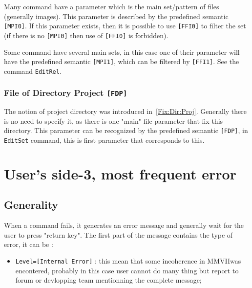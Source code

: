 \documentclass[a4paper]{book}
\newcommand{\PPP}{MMVII}
\begin{document}
{Many command have a parameter which is the main set/pattern of files (generally images).
This  parameter is described by the predefined semantic {\tt [MPI0]}. If this
parameter exists, then  it is possible to use {\tt [FFI0]} to filter the set (if there
is no {\tt [MPI0]} then use of {\tt [FFI0]}  is forbidden).

Some command have several main sets, in this case one of their parameter will have
the predefined semantic {\tt [MPI1]}, which can be filtered by {\tt [FFI1]}. See
the command {\tt EditRel}.



\subsubsection{File of Directory Project {\tt [FDP]}}

The notion of project directory was introduced in~\ref{Fix:Dir:Proj}.
Generally there is no need to specify it, as there is one "main" file parameter
that fix this directory. This parameter can be recognized by the predefined
semantic  {\tt [FDP]}, in {\tt EditSet} command, this is first parameter that
corresponds to this.





\section{User's side-3, most frequent error}



\subsection{Generality}

When a command fails, it generates an error message and generally wait for 
the user to press "return key".
The first part of the message contains the type of error, it can be :

\begin{itemize}
   \item {\tt Level=[Internal Error]} : this mean that some incoherence in \PPP was encontered,
         probably in this case user cannot do many thing but report to forum or devlopping team
         mentionning the complete message;


\end{itemize}}
\end{document}
